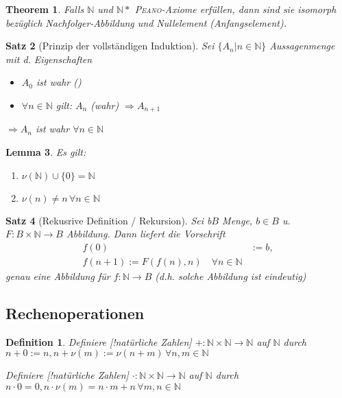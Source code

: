 \documentclass[ngerman,a4paper]{report}
\theoremstyle{break}
\newtheorem{theorem}{Theorem}[section]
\newtheorem{lemma}[theorem]{Lemma}
\newtheorem{satz}[theorem]{Satz}
\newtheorem*{definition}{Definition}
\newcommand{\person}[1]{\textsc{#1}}
\begin{document}
\begin{theorem}
	Falls $\mathbb{N}$ und $\mathbb{N}*$ \person{Peano}-Axiome erfüllen, dann sind sie isomorph bezüglich Nachfolger-Abbildung und Nullelement (Anfangselement).
\end{theorem}

\begin{satz}[Prinzip der vollständigen Induktion]
	Sei $\{A_n | n\in\mathbb{N}\}$ Aussagenmenge mit d. Eigenschaften
	\begin{itemize}
		\item[(IA)] $A_0$ ist wahr ()
		\item[(IS)] $\forall n\in\mathbb{N}$ gilt: $A_n$ (wahr) $\Rightarrow A_{n+1}$
	\end{itemize}
	$\Rightarrow A_n$ ist wahr $\forall n\in\mathbb{N}$
\end{satz}

\begin{lemma}
	Es gilt:
	\begin{enumerate}[label={\alph*)}]
		\item $\nu(\mathbb{N})\cup \{0\}=\mathbb{N}$
		\item $\nu(n)\neq n\,\forall n\in\mathbb{N}$
	\end{enumerate}
\end{lemma}

\begin{satz}[Rekusrive Definition / Rekursion]
	Sei b$B$ Menge, $b\in B$ u. $F:B\times\mathbb{N}\rightarrow B$ Abbildung. Dann liefert die Vorschrift \begin{align*}
		f(0) &:= b,\\f(n+1):=F(f(n),n)\quad\forall n\in \mathbb{N}
	\end{align*}
	genau eine Abbildung für $f:\mathbb{N}\rightarrow B$ (d.h. solche Abbildung ist eindeutig)
\end{satz}

\subsection*{Rechenoperationen}
\begin{definition}
	Definiere [!natürliche Zahlen] $+:\mathbb{N}\times\mathbb{N}\rightarrow \mathbb{N}$ auf $\mathbb{N}$ durch $n+0:=n, n+\nu(m) :=\nu(n+m)\,\forall n,m\in\mathbb{N}$
	
	Definiere [!natürliche Zahlen] $\cdot:\mathbb{N}\times\mathbb{N} \rightarrow\mathbb{N}$ auf $\mathbb{N}$ durch $n\cdot 0 = 0, n\cdot\nu(m) = n\cdot m+n\,\forall m,n\in\mathbb{N}$
\end{definition}
\end{document}
